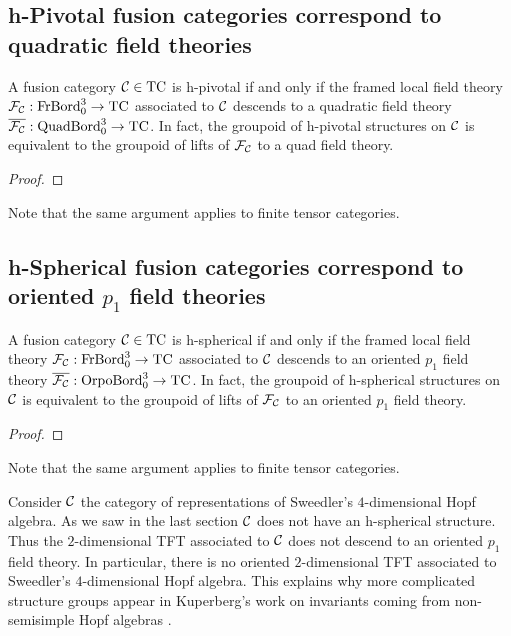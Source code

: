 \documentclass{amsart}
\begin{document}
\subsection{h-Pivotal fusion categories correspond to quadratic field theories} \label{sec-pivot-orpo}

\begin{theorem} \label{thm-hpivotal}
A fusion category $\mathcal C \in \mathrm{TC}$ is h-pivotal if and only if the framed local field theory $\mathcal F_{\mathcal C} : \mathrm{FrBord}_0^3 \rightarrow \mathrm{TC}$ associated to $\mathcal C$ descends to a quadratic field theory $\overline{\mathcal F_{\mathcal C}} : \mathrm{QuadBord}_0^3 \rightarrow \mathrm{TC}$.  In fact, the groupoid of h-pivotal structures on $\mathcal C$ is equivalent to the groupoid of lifts of $\mathcal F_{\mathcal C}$ to a quad field theory.
\end{theorem}
\begin{proof}
\end{proof}

Note that the same argument applies to finite tensor categories.  

\subsection{h-Spherical fusion categories correspond to oriented $p_1$ field theories}

\begin{theorem} \label{thm-hspherical}
A fusion category $\mathcal C \in \mathrm{TC}$ is h-spherical if and only if the framed local field theory $\mathcal F_{\mathcal C} : \mathrm{FrBord}_0^3 \rightarrow \mathrm{TC}$ associated to $\mathcal C$ descends to an oriented $p_1$ field theory $\overline{\mathcal F_{\mathcal C}} : \mathrm{OrpoBord}_0^3 \rightarrow \mathrm{TC}$.  In fact, the groupoid of h-spherical structures on $\mathcal C$ is equivalent to the groupoid of lifts of $\mathcal F_{\mathcal C}$ to an oriented $p_1$ field theory.
\end{theorem}
\begin{proof}
\end{proof}

Note that the same argument applies to finite tensor categories. 

\begin{example}
Consider $\mathcal C$ the category of representations of Sweedler's $4$-dimensional Hopf algebra.  As we saw in the last section $\mathcal C$ does not have an h-spherical structure.  Thus the $2$-dimensional TFT associated to $\mathcal C$ does not descend to an oriented $p_1$ field theory.  In particular, there is no oriented $2$-dimensional TFT associated to Sweedler's $4$-dimensional Hopf algebra.  This explains why more complicated structure groups appear in Kuperberg's work on invariants coming from non-semisimple Hopf algebras \cite{MR1394749}.
\end{example}
\end{document}
